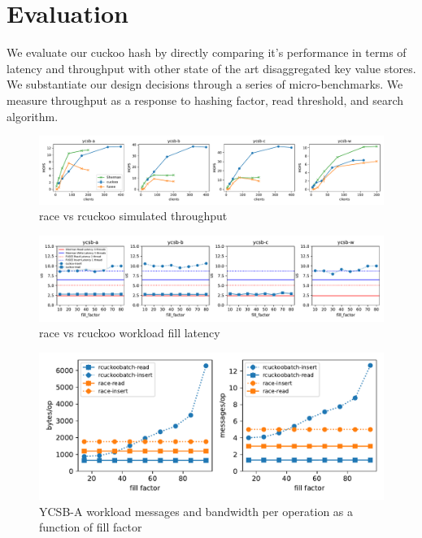 \section{Evaluation}
\label{sec:eval}

We evaluate our cuckoo hash by directly comparing it's
performance in terms of latency and throughput with other
state of the art disaggregated key value stores. We
substantiate our design decisions through a series of
micro-benchmarks. We measure throughput as a response to
hashing factor, read threshold, and search algorithm.

\begin{figure}[ht]
    \includegraphics[width=0.99\linewidth]{fig/hero_ycsb_throughput.pdf}
    \caption{race vs rcuckoo simulated throughput }
    \label{fig:ycsb_throughput}
\end{figure}

\begin{figure}[ht]
    \includegraphics[width=0.99\linewidth]{fig/hero_ycsb_fill_latency.pdf}
    \caption{race vs rcuckoo workload fill latency}
    \label{fig:ycsb_fill_latency}
\end{figure}

\begin{figure}[ht]
    \includegraphics[width=0.99\linewidth]{fig/hero_ycsb_fill_ops_bw.pdf}
    \caption{YCSB-A workload messages and bandwidth per operation as a function of fill factor}
    \label{fig:ycsb_fill_ops_bw}
\end{figure}

